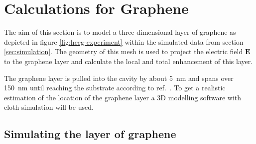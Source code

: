 \newpage
\null
\newpage
\section{Calculations for Graphene}
\label{sec:calculations}

The aim of this section is to model a three dimensional layer of graphene as depicted in figure \ref{fig:heeg-experiment} within the simulated data from section \ref{sec:simulation}. The geometry of this mesh is used to project the electric field $\mathbf{E}$ to the graphene layer and calculate the local and total enhancement of this layer.

The graphene layer is pulled into the cavity by about \SI{5}{nm} and spans over \SI{150}{nm} until reaching the substrate according to ref.~\cite{heeg}. To get a realistic estimation of the location of the graphene layer a 3D modelling software with cloth simulation will be used.

\subsection{Simulating the layer of graphene}

